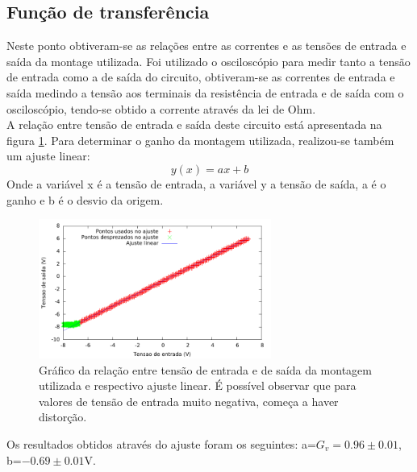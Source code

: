 \documentclass[%
  reprint,
  nofootinbib,
  amsmath,amssymb,
  aps,
  10pt,
  a4paper
]{revtex4-1}
\begin{document}
\subsection{Função de transferência}
Neste ponto obtiveram-se as relações entre as correntes e as tensões de entrada e saída da montage utilizada. Foi utilizado o osciloscópio para medir tanto a tensão de entrada como a de saída do circuito, obtiveram-se as correntes de entrada e saída medindo a tensão aos terminais da resistência de entrada e de saída com o osciloscópio, tendo-se obtido a corrente através da lei de Ohm.\\
A relação entre tensão de entrada e saída deste circuito está apresentada na figura \ref{fig:v_rel}. Para determinar o ganho da montagem utilizada, realizou-se também um ajuste linear:
\begin{equation}
y(x)=ax+b
\end{equation}
Onde a variável x é a tensão de entrada, a variável y a tensão de saída, a é o ganho e b é o desvio da origem.
\begin{figure}
\includegraphics[width=3in]{v_rel.pdf}
\caption{Gráfico da relação entre tensão de entrada e de saída da montagem utilizada e respectivo ajuste linear. É possível observar que para valores de tensão de entrada muito negativa, começa a haver distorção.}
\label{fig:v_rel}
\end{figure}
Os resultados obtidos através do ajuste foram os seguintes: a=$G_v=0.96\pm0.01$, b=$-0.69\pm0.01$V.
\end{document}

